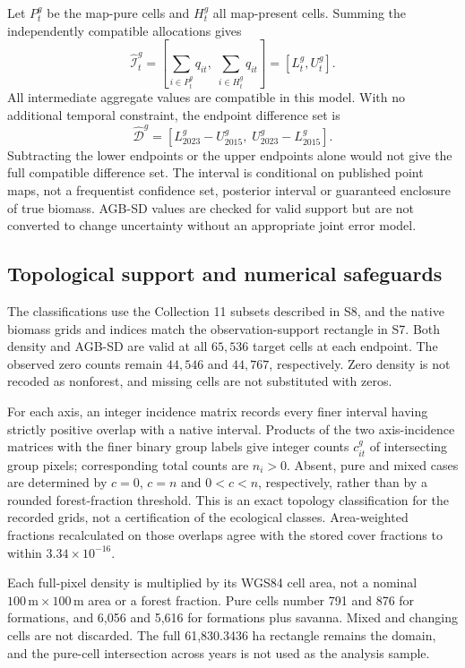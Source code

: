 \documentclass[11pt,a4paper]{article}
\begin{document}
Let $P_t^g$ be the map-pure cells and $H_t^g$ all map-present cells. Summing the independently compatible allocations gives
\begin{equation}
\widehat{\mathcal I}_t^g=\left[\sum_{i\in P_t^g}q_{it},\;\sum_{i\in H_t^g}q_{it}\right]=[L_t^g,U_t^g].
\end{equation}
All intermediate aggregate values are compatible in this model. With no additional temporal constraint, the endpoint difference set is
\begin{equation}
\widehat{\mathcal D}^g=[L_{2023}^g-U_{2015}^g,\;U_{2023}^g-L_{2015}^g].
\end{equation}
Subtracting the lower endpoints or the upper endpoints alone would not give the full compatible difference set. The interval is conditional on published point maps, not a frequentist confidence set, posterior interval or guaranteed enclosure of true biomass. AGB-SD values are checked for valid support but are not converted to change uncertainty without an appropriate joint error model.

\subsection{Topological support and numerical safeguards}
The classifications use the Collection 11 subsets described in S8, and the native biomass grids and indices match the observation-support rectangle in S7. Both density and AGB-SD are valid at all $65{,}536$ target cells at each endpoint. The observed zero counts remain $44{,}546$ and $44{,}767$, respectively. Zero density is not recoded as nonforest, and missing cells are not substituted with zeros.

For each axis, an integer incidence matrix records every finer interval having strictly positive overlap with a native interval. Products of the two axis-incidence matrices with the finer binary group labels give integer counts $c_{it}^g$ of intersecting group pixels; corresponding total counts are $n_i>0$. Absent, pure and mixed cases are determined by $c=0$, $c=n$ and $0<c<n$, respectively, rather than by a rounded forest-fraction threshold. This is an exact topology classification for the recorded grids, not a certification of the ecological classes. Area-weighted fractions recalculated on those overlaps agree with the stored cover fractions to within $3.34\times10^{-16}$.

Each full-pixel density is multiplied by its WGS84 cell area, not a nominal $100\,\mathrm m\times100\,\mathrm m$ area or a forest fraction. Pure cells number 791 and 876 for formations, and 6,056 and 5,616 for formations plus savanna. Mixed and changing cells are not discarded. The full 61,830.3436 ha rectangle remains the domain, and the pure-cell intersection across years is not used as the analysis sample.
\end{document}
